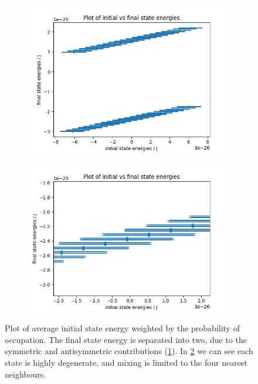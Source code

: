 \begin{figure}[htbp]
    \centering
    \begin{subfigure}{0.45\linewidth}
        \includegraphics[width=0.9\linewidth]{Figures/Simulation/Plot of single band eigenstate energy range.png}
        \label{fig:initial and final state energies of single band}
    \end{subfigure}
    \hfill
    \begin{subfigure}{0.45\linewidth}
        \includegraphics[width=0.9\linewidth]{Figures/Simulation/Plot of single band eigenstate energy range closeup.png}
        \label{fig:initial and final state energies of single band zoom}
    \end{subfigure}
    \caption{Plot of average initial state energy weighted by the
        probability of occupation. The final
        state energy is separated into two,
        due to the symmetric and antisymmetric
        contributions
        (\cref{fig:initial and final state energies of single band}).
        In \cref{fig:initial and final state energies of single band zoom}
        we can see each state is highly degenerate, and mixing
        is limited to the four nearest neighbours.
    }\label{fig:single band energies}
\end{figure}


